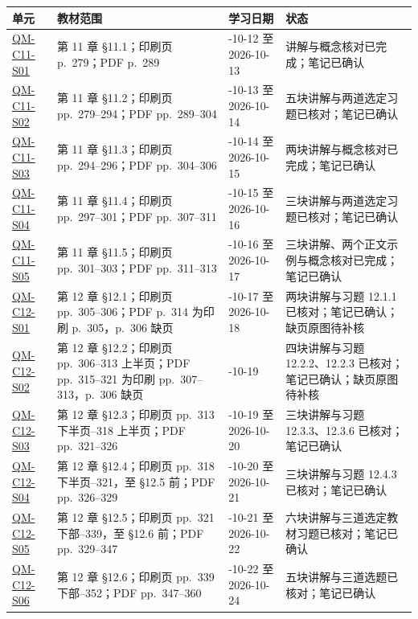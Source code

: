 \begin{center}
\footnotesize
\renewcommand{\arraystretch}{1.0}
\begin{tabularx}{\textwidth}{@{}>{\raggedright\arraybackslash}p{2.7cm}>{\raggedright\arraybackslash}p{4.1cm}>{\raggedright\arraybackslash}p{3.0cm}X@{}}
  \toprule
  单元 & 教材范围 & 学习日期 & 状态 \\
  \midrule
  \hyperref[section:QM-C11-S01]{QM-C11-S01} & 第 11 章 \S 11.1；印刷页 p.~279；PDF p.~289 & 2026-10-12 至 2026-10-13 & 讲解与概念核对已完成；笔记已确认 \\
  \hyperref[section:QM-C11-S02]{QM-C11-S02} & 第 11 章 \S 11.2；印刷页 pp.~279--294；PDF pp.~289--304 & 2026-10-13 至 2026-10-14 & 五块讲解与两道选定习题已核对；笔记已确认 \\
  \hyperref[section:QM-C11-S03]{QM-C11-S03} & 第 11 章 \S 11.3；印刷页 pp.~294--296；PDF pp.~304--306 & 2026-10-14 至 2026-10-15 & 两块讲解与概念核对已完成；笔记已确认 \\
  \hyperref[section:QM-C11-S04]{QM-C11-S04} & 第 11 章 \S 11.4；印刷页 pp.~297--301；PDF pp.~307--311 & 2026-10-15 至 2026-10-16 & 三块讲解与两道选定习题已核对；笔记已确认 \\
  \hyperref[section:QM-C11-S05]{QM-C11-S05} & 第 11 章 \S 11.5；印刷页 pp.~301--303；PDF pp.~311--313 & 2026-10-16 至 2026-10-17 & 三块讲解、两个正文示例与概念核对已完成；笔记已确认 \\
  \hyperref[section:QM-C12-S01]{QM-C12-S01} & 第 12 章 \S 12.1；印刷页 pp.~305--306；PDF p.~314 为印刷 p.~305，p.~306 缺页 & 2026-10-17 至 2026-10-18 & 两块讲解与习题 12.1.1 已核对；笔记已确认；缺页原图待补核 \\
  \hyperref[section:QM-C12-S02]{QM-C12-S02} & 第 12 章 \S 12.2；印刷页 pp.~306--313 上半页；PDF pp.~315--321 为印刷 pp.~307--313，p.~306 缺页 & 2026-10-19 & 四块讲解与习题 12.2.2、12.2.3 已核对；笔记已确认；缺页原图待补核 \\
  \hyperref[section:QM-C12-S03]{QM-C12-S03} & 第 12 章 \S 12.3；印刷页 pp.~313 下半页--318 上半页；PDF pp.~321--326 & 2026-10-19 至 2026-10-20 & 三块讲解与习题 12.3.3、12.3.6 已核对；笔记已确认 \\
  \hyperref[section:QM-C12-S04]{QM-C12-S04} & 第 12 章 \S 12.4；印刷页 pp.~318 下半页--321，至 \S 12.5 前；PDF pp.~326--329 & 2026-10-20 至 2026-10-21 & 三块讲解与习题 12.4.3 已核对；笔记已确认 \\
  \hyperref[section:QM-C12-S05]{QM-C12-S05} & 第 12 章 \S 12.5；印刷页 pp.~321 下部--339，至 \S 12.6 前；PDF pp.~329--347 & 2026-10-21 至 2026-10-22 & 六块讲解与三道选定教材习题已核对；笔记已确认 \\
  \hyperref[section:QM-C12-S06]{QM-C12-S06} & 第 12 章 \S 12.6；印刷页 pp.~339 下部--352；PDF pp.~347--360 & 2026-10-22 至 2026-10-24 & 五块讲解与三道选题已核对；笔记已确认 \\
  \bottomrule
\end{tabularx}
\end{center}

